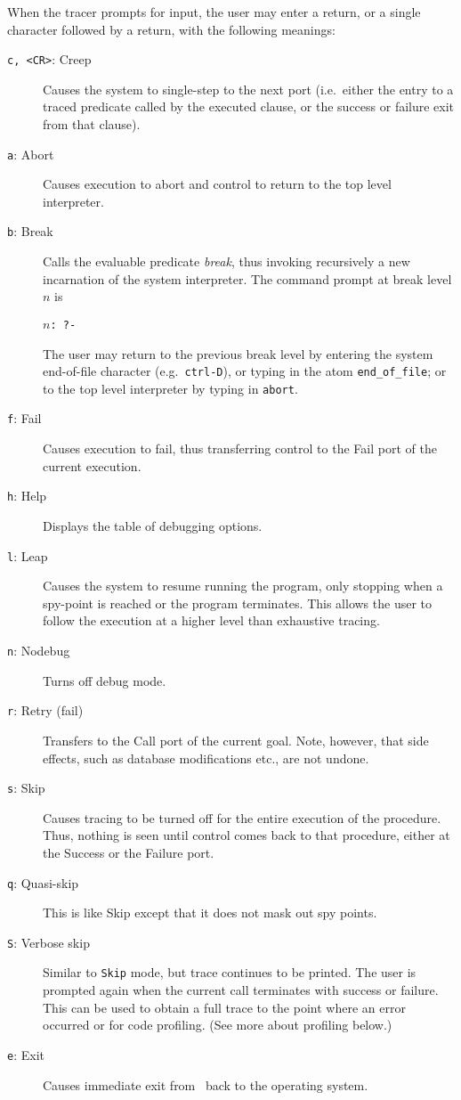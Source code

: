 When the tracer prompts for input, the user may enter a return, or a single
character followed by a return, with the following meanings:
\begin{description}
\item[{\tt c, <CR>}: Creep] Causes the system to single-step to the next
  port (i.e.\ either the entry to a traced predicate called by the executed
  clause, or the success or failure exit from that clause).
\item[{\tt a}: Abort] Causes execution to abort
  and control to return to the top level interpreter.
\item[{\tt b}: Break] Calls the evaluable predicate {\em break}, thus
  invoking recursively a new incarnation of the system interpreter.  The
  command prompt at break level $n$ is
  \begin{center}
    {\tt $n$: \tt ?-}
  \end{center}
  The user may return to the previous break level by entering the system
  end-of-file character (e.g.\ {\tt ctrl-D}), or typing in the atom 
  {\tt end\_of\_file}; or to the top level interpreter by typing in
  {\tt abort}.
\item[{\tt f}: Fail] Causes execution to fail, thus transferring control to
  the Fail port of the current execution.
\item[{\tt h}: Help] Displays the table of debugging options.
\item[{\tt l}: Leap] Causes the system to resume running the program, only
  stopping when a spy-point is reached or the program terminates.  This
  allows the user to follow the execution at a higher level than exhaustive
  tracing.
\item[{\tt n}: Nodebug] Turns off debug mode.
\item[{\tt r}: Retry (fail)] Transfers to the Call port of the current
  goal.  Note, however, that side effects, such as database modifications
  etc., are not undone.
\item[{\tt s}: Skip] Causes tracing to be turned off for the entire
  execution of the procedure.  Thus, nothing is seen until control comes
  back to that procedure, either at the Success or the Failure port.
\item[{\tt q}: Quasi-skip] This is like Skip except that it does not mask
  out spy points.
\item[{\tt S}: Verbose skip] Similar to {\tt Skip} mode, but trace
  continues to be printed. The user is prompted again when the current call
  terminates with success or failure.  This can be used to obtain a full
  trace to the point where an error occurred or for code profiling. (See
  more about profiling below.)
\item[{\tt e}: Exit] Causes immediate exit from \ourprolog\ back to the
  operating system.
\end{description}

